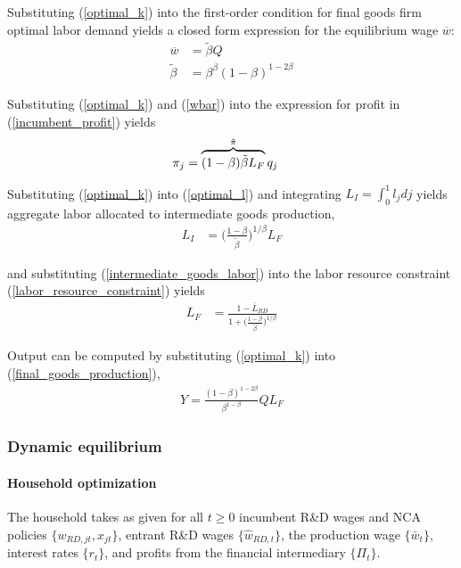 \documentclass[11pt,english]{article}
\begin{document}
Substituting (\ref{optimal_k}) into the first-order condition for final goods firm optimal labor demand yields a closed form expression for the equilibrium wage $\overline{w}$:
\begin{align}
\overline{w} &= \tilde{\beta} Q \label{wbar} \\
\tilde{\beta} &= \beta^{\beta} (1-\beta)^{1-2\beta} \label{def_cbeta}
\end{align}

Substituting (\ref{optimal_k}) and (\ref{wbar}) into the expression for profit in (\ref{incumbent_profit}) yields
\begin{align}
\pi_j &= \overbrace{(1-\beta) \tilde{\beta} L_F}^{\mathclap{\tilde{\pi}}} q_j \label{profits_eq}
\end{align}

Substituting (\ref{optimal_k}) into (\ref{optimal_l}) and integrating $L_I = \int_0^1 l_j dj$ yields aggregate labor allocated to intermediate goods production,
\begin{align}
L_I &= \Big( \frac{1-\beta}{\tilde{\beta}} \Big)^{1 / \beta} L_F \label{intermediate_goods_labor}
\end{align}

and substituting (\ref{intermediate_goods_labor}) into the labor resource constraint (\ref{labor_resource_constraint}) yields
\begin{align}
L_F &= \frac{1 - \bar{L}_{RD}}{1 + \Big(\frac{1-\beta}{\tilde{\beta}}\Big)^{1/\beta}}
\end{align}

Output can be computed by substituting (\ref{optimal_k}) into (\ref{final_goods_production}), 
\begin{align}
Y = \frac{(1-\beta)^{1-2\beta}}{\beta^{1-\beta}} Q L_F \label{flow_output}
\end{align}

\subsubsection{Dynamic equilibrium}\label{subsubsec:dynamic_equilibrium_original_solution}

\paragraph{Household optimization}

The household takes as given for all $t \ge 0$ incumbent R\&D wages and NCA policies $\{w_{RD,jt}, x_{jt}\}$, entrant R\&D wages $\{\hat{w}_{RD,t}\}$, the production wage $\{\bar{w}_t\}$, interest rates $\{r_t\}$, and profits from the financial intermediary $\{\Pi_t\}$. 
\end{document}
